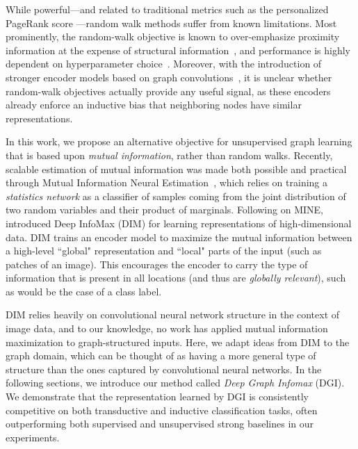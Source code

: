 \documentclass{article} \usepackage{iclr2019_conference,times}
\begin{document}
While powerful---and related to traditional metrics such as the personalized PageRank score \citep{jeh2003scaling}---random walk methods suffer from known limitations. Most prominently, the random-walk objective is known to over-emphasize proximity information at the expense of structural information~\citep{ribeiro2017struc2vec}, and performance is highly dependent on hyperparameter choice~\citep{grover2016node2vec,perozzi2014deepwalk}.
Moreover, with the introduction of stronger encoder models based on graph convolutions~\citep{gilmer2017neural}, it is unclear whether random-walk objectives actually provide any useful signal, as these encoders already enforce an inductive bias that neighboring nodes have similar representations.

In this work, we propose an alternative objective for unsupervised graph learning that is based upon {\em mutual information}, rather than random walks.
Recently, scalable estimation of mutual information was made both possible and practical through Mutual Information Neural Estimation~\citep[MINE,][]{belghazi2018mine}, which relies on training a \emph{statistics network} as a classifier of samples coming from the joint distribution of two random variables and their product of marginals.
Following on MINE, \citet{hjelm2018learning} introduced Deep InfoMax (DIM) for learning representations of high-dimensional data.
DIM trains an encoder model to maximize the mutual information between a high-level ``global" representation and  ``local" parts of the input (such as patches of an image).
This encourages the encoder to carry the type of information that is present in all locations (and thus are \emph{globally relevant}), such as would be the case of a class label.

DIM relies heavily on convolutional neural network structure in the context of image data, and to our knowledge, no work has applied mutual information maximization to graph-structured inputs.
Here, we adapt ideas from DIM to the graph domain, which can be thought of as having a more general type of structure than the ones captured by convolutional neural networks.
In the following sections, we introduce our method called \emph{Deep Graph Infomax} (DGI).
We demonstrate that the representation learned by DGI is consistently competitive on both transductive and inductive classification tasks, often outperforming both supervised and unsupervised strong baselines in our experiments.
\end{document}
